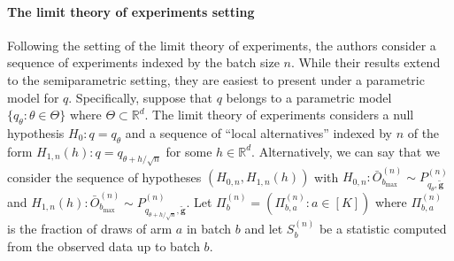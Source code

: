 \paragraph{The limit theory of experiments setting} Following the setting of the limit theory of experiments, the authors consider a sequence of experiments indexed by the batch size $n$. While their results extend to the semiparametric setting, they are easiest to present under a parametric model for $q$. Specifically, suppose that $q$ belongs to a parametric model $\{ q_\theta : \theta \in \Theta\}$ where $\Theta \subset \mathbb{R}^d$. The limit theory of experiments considers a null hypothesis $H_0 : q = q_\theta$ and a sequence of ``local alternatives'' indexed by $n$ of the form $H_{1,n}(h) :  q = q_{\theta + h / \sqrt{n}}$ for some $h \in \mathbb{R}^d$. Alternatively, we can say that we consider the sequence of hypotheses $(H_{0,n}, H_{1,n}(h))$ with $H_{0,n} : \bar O^{(n)}_{b_{\max}} \sim P^{(n)}_{q_{\theta}, \widetilde{\bm{g}}}$ and $H_{1,n}(h) : \bar O^{(n)}_{b_{\max}} \sim P^{(n)}_{q_{\theta + h / \sqrt{n}}, \widetilde{\bm{g}}}$. Let $\Pi_b^{(n)} = (\Pi_{b, a}^{(n)} : a \in [K])$ where $\Pi_{b, a}^{(n)}$ is the fraction of draws of arm $a$ in batch $b$ and let $S^{(n)}_b$ be a statistic computed from the observed data up to batch $b$.


